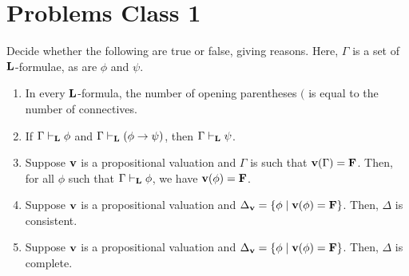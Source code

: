 \section*{Problems Class 1}
\setcounter{PC}{1}

\begin{boxproblem}
    Decide whether the following are true or false, giving reasons. Here, $\Gamma$ is a set of $\mathbf{L}$-formulae, as are $\phi$ and $\psi$.
    \begin{enumerate}[label = \normalfont \arabic*.]
        \item In every $\mathbf{L}$-formula, the number of opening parentheses $($ is equal to the number of connectives.
        
        \item If $\Gamma \vdash_{\mathbf{L}} \phi$ and $\Gamma \vdash_{\mathbf{L}} \left( \phi \to \psi \right)$, then $\Gamma \vdash_{\mathbf{L}} \psi$.
        
        \item Suppose $\mathbf{v}$ is a propositional valuation and $\Gamma$ is such that $\mathbf{v}\!\left( \Gamma \right) = \mathbf{F}$. Then, for all $\phi$ such that $\Gamma \vdash_{\mathbf{L}} \phi$, we have $\mathbf{v}\!\left( \phi \right) = \mathbf{F}$.
        
        \item Suppose $\mathbf{v}$ is a propositional valuation and $\Delta_{\mathbf{v}} = \left\{ \phi \; \middle\vert \; \mathbf{v}\!\left( \phi \right) = \mathbf{F} \right\}$. Then, $\Delta$ is consistent.
        
        \item Suppose $\mathbf{v}$ is a propositional valuation and $\Delta_{\mathbf{v}} = \left\{ \phi \; \middle\vert \; \mathbf{v}\!\left( \phi \right) = \mathbf{F} \right\}$. Then, $\Delta$ is complete.
    \end{enumerate}
\end{boxproblem}

